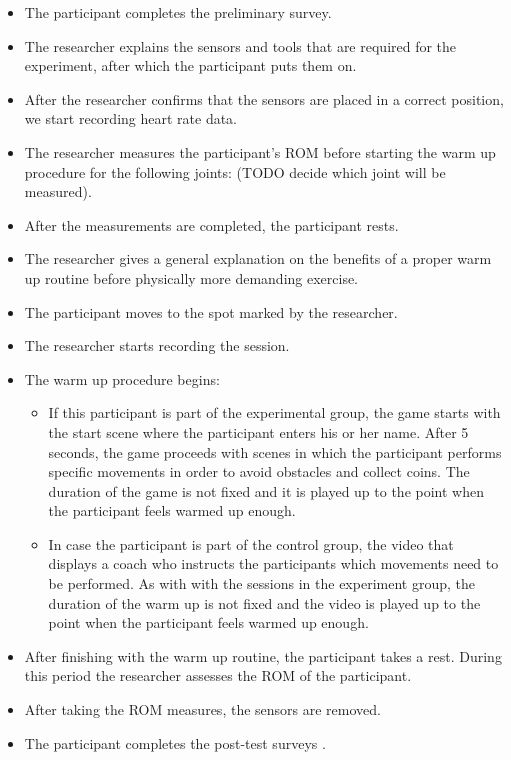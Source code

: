 \begin{itemize}
\item The participant completes the preliminary survey.
\item The researcher explains the sensors and tools that are required for the experiment, after which the participant puts them on. 
\item After the researcher confirms that the sensors are placed in a correct position, we start recording heart rate data.
\item The researcher measures the participant's ROM before starting the warm up procedure for the following joints: (TODO decide which joint will be measured).
\item After the measurements are completed, the participant rests.
\item The researcher gives a general explanation on the benefits of a proper warm up routine before physically more demanding exercise.
\item The participant moves to the spot marked by the researcher.
\item The researcher starts recording the session. 
\item The warm up procedure begins:
\begin{itemize}
\item If this participant is part of the experimental group, the game starts with the start scene where the participant enters his or her name. After 5 seconds, the game proceeds with scenes in which the participant performs specific movements in order to avoid obstacles and collect coins. The duration of the game is not fixed and it is played up to the point when the participant feels warmed up enough. 
\item  In case the participant is part of the control group, the video that displays a coach who instructs the participants which movements need to be performed. As with with the sessions in the experiment group, the duration of the warm up is not fixed and the video is played up to the point when the participant feels warmed up enough.
\end{itemize}
\item After finishing with the warm up routine, the participant takes a rest. During this period the researcher assesses the ROM of the participant. 
\item After taking the ROM measures, the sensors are removed.
\item The participant completes the post-test surveys . %
\end{itemize}
